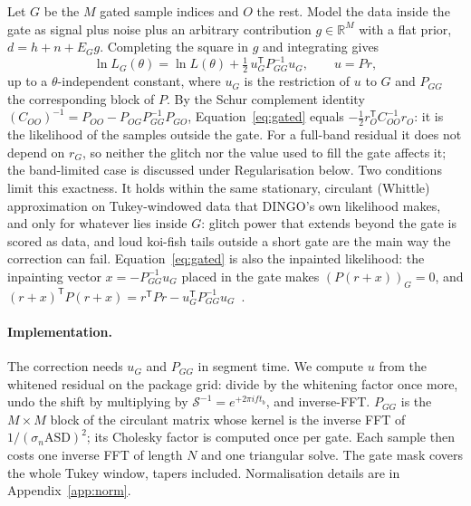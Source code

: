 \documentclass{openjournal}
\newcommand{\tp}{^{\mathsf{T}}}
\begin{document}
Let $G$ be the $M$ gated sample indices and $O$ the rest.
Model the data inside the gate as signal plus noise plus an arbitrary contribution $g\in\mathbb{R}^M$ with a flat prior, $d = h + n + E_G g$.
Completing the square in $g$ and integrating gives
\begin{equation}
\ln L_G(\theta) = \ln L(\theta) + \tfrac12\, u_G\tp P_{GG}^{-1} u_G, \qquad u = P r,
\label{eq:gated}
\end{equation}
up to a $\theta$-independent constant, where $u_G$ is the restriction of $u$ to $G$ and $P_{GG}$ the corresponding block of $P$.
By the Schur complement identity $(C_{OO})^{-1} = P_{OO} - P_{OG}P_{GG}^{-1}P_{GO}$, Equation~\eqref{eq:gated} equals $-\tfrac12 r_O\tp C_{OO}^{-1} r_O$: it is the likelihood of the samples outside the gate.
For a full-band residual it does not depend on $r_G$, so neither the glitch nor the value used to fill the gate affects it; the band-limited case is discussed under Regularisation below.
Two conditions limit this exactness. It holds within the same stationary, circulant (Whittle) approximation on Tukey-windowed data that DINGO's own likelihood makes, and only for whatever lies inside $G$: glitch power that extends beyond the gate is scored as data, and loud koi-fish tails outside a short gate are the main way the correction can fail.
Equation~\eqref{eq:gated} is also the inpainted likelihood: the inpainting vector $x=-P_{GG}^{-1}u_G$ placed in the gate makes $(P(r+x))_G=0$, and $(r+x)\tp P(r+x) = r\tp P r - u_G\tp P_{GG}^{-1}u_G$~\cite{Zackay2021nongaussian,Capano2023multimode}.

\paragraph{Implementation.}
The correction needs $u_G$ and $P_{GG}$ in segment time.
We compute $u$ from the whitened residual on the package grid: divide by the whitening factor once more, undo the shift by multiplying by $\mathcal{S}^{-1}=e^{+2\pi i f t_b}$, and inverse-FFT.
$P_{GG}$ is the $M\times M$ block of the circulant matrix whose kernel is the inverse FFT of $1/(\sigma_n\mathrm{ASD})^2$; its Cholesky factor is computed once per gate.
Each sample then costs one inverse FFT of length $N$ and one triangular solve.
The gate mask covers the whole Tukey window, tapers included.
Normalisation details are in Appendix~\ref{app:norm}.
\end{document}
